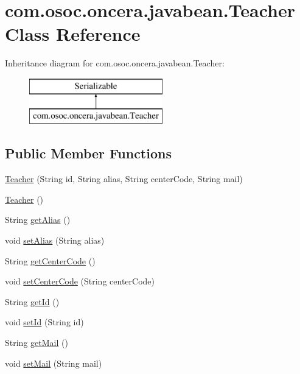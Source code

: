 \hypertarget{classcom_1_1osoc_1_1oncera_1_1javabean_1_1_teacher}{}\section{com.\+osoc.\+oncera.\+javabean.\+Teacher Class Reference}
\label{classcom_1_1osoc_1_1oncera_1_1javabean_1_1_teacher}
Inheritance diagram for com.\+osoc.\+oncera.\+javabean.\+Teacher\+:\begin{figure}[H]
\begin{center}
\leavevmode
\includegraphics[height=2.000000cm]{classcom_1_1osoc_1_1oncera_1_1javabean_1_1_teacher}
\end{center}
\end{figure}
\subsection*{Public Member Functions}
\begin{DoxyCompactItemize}
\item 
\mbox{\hyperlink{classcom_1_1osoc_1_1oncera_1_1javabean_1_1_teacher_a7906272857333ea9432c8874dfe2df42}{Teacher}} (String id, String alias, String center\+Code, String mail)
\item 
\mbox{\hyperlink{classcom_1_1osoc_1_1oncera_1_1javabean_1_1_teacher_a5ba9ac126ffb08869bdd66d72dadbcc3}{Teacher}} ()
\item 
String \mbox{\hyperlink{classcom_1_1osoc_1_1oncera_1_1javabean_1_1_teacher_a8d13d35136f0351a7f5f7d3a02aeee8c}{get\+Alias}} ()
\item 
void \mbox{\hyperlink{classcom_1_1osoc_1_1oncera_1_1javabean_1_1_teacher_a36605e4dea940ff32d413ba3ccbc1937}{set\+Alias}} (String alias)
\item 
String \mbox{\hyperlink{classcom_1_1osoc_1_1oncera_1_1javabean_1_1_teacher_a20456b898a6b84fc58b7d801a25eeec7}{get\+Center\+Code}} ()
\item 
void \mbox{\hyperlink{classcom_1_1osoc_1_1oncera_1_1javabean_1_1_teacher_a90444ad83e8b315f01f700394d70a029}{set\+Center\+Code}} (String center\+Code)
\item 
String \mbox{\hyperlink{classcom_1_1osoc_1_1oncera_1_1javabean_1_1_teacher_a9fbb393758670fa6dd802e291d3f5dbc}{get\+Id}} ()
\item 
void \mbox{\hyperlink{classcom_1_1osoc_1_1oncera_1_1javabean_1_1_teacher_a335727fa6d1c0fea65a0090705f82e28}{set\+Id}} (String id)
\item 
String \mbox{\hyperlink{classcom_1_1osoc_1_1oncera_1_1javabean_1_1_teacher_ae300cd0e5bc6c620d1fc16cd6e92dc79}{get\+Mail}} ()
\item 
void \mbox{\hyperlink{classcom_1_1osoc_1_1oncera_1_1javabean_1_1_teacher_aa2304cc6cc27ec32b9494e439de014c8}{set\+Mail}} (String mail)
\end{DoxyCompactItemize}


